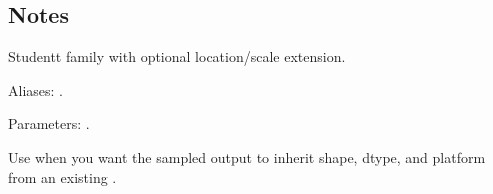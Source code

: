 \documentclass[letterpaper,10pt,english]{sphinxmanual}
\begin{document}
\begin{sphinxVerbatim}[commandchars=\\\{\}]
\end{sphinxVerbatim}


\subsection{Notes}
\label{\detokenize{distribution_catalog:id107}}
\sphinxAtStartPar
Student\sphinxhyphen{}t family with optional location/scale extension.

\sphinxAtStartPar
Aliases: .

\sphinxAtStartPar
Parameters: .

\sphinxAtStartPar
Use  when you want the sampled output to inherit shape, dtype, and platform from an existing .
\end{document}
